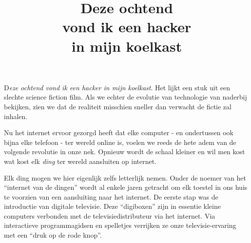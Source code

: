 \documentclass[DIV=calc,paper=a4,fontsize=11pt,twocolumn]{scrartcl}
\title{Deze ochtend\\vond ik een hacker\\in mijn koelkast}
\date{}
\newcommand{\initial}[1]{
\lettrine[lines=4,lhang=0.3,nindent=0em]{
\color{VeryDarkGrey}
{\textsf{#1}}}{}}
\begin{document}

\initial{D}\emph{eze ochtend vond ik een hacker in mijn koelkast}. Het lijkt
een stuk uit een slechte science fiction film. Als we echter de evolutie van
technologie van naderbij bekijken, zien we dat de realiteit misschien sneller
dan verwacht de fictie zal inhalen.

Nu het internet ervoor gezorgd heeft dat elke computer - en ondertussen ook
bijna elke telefoon - ter wereld online is, voelen we reeds de hete adem van de
volgende revolutie in onze nek. Opnieuw wordt de schaal kleiner en wil men kost
wat kost elk \emph{ding} ter wereld aansluiten op internet.

Elk ding mogen we hier eigenlijk zelfs letterlijk nemen. Onder de noemer van
het ``internet van de dingen'' wordt al enkele jaren getracht om elk toestel in
ons huis te voorzien van een aansluiting naar het internet. De eerste stap was
de introductie van digitale televisie. Deze ``digiboxen'' zijn in essentie
kleine computers verbonden met de televisiedistributeur via het internet. Via
interactieve programmagidsen en spelletjes verrijken ze onze televisie-ervaring
met een ``druk op de rode knop''.
\end{document}
